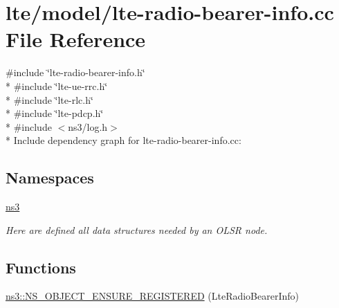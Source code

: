 \hypertarget{lte-radio-bearer-info_8cc}{}\section{lte/model/lte-\/radio-\/bearer-\/info.cc File Reference}
\label{lte-radio-bearer-info_8cc}
{\ttfamily \#include \char`\"{}lte-\/radio-\/bearer-\/info.\+h\char`\"{}}\\*
{\ttfamily \#include \char`\"{}lte-\/ue-\/rrc.\+h\char`\"{}}\\*
{\ttfamily \#include \char`\"{}lte-\/rlc.\+h\char`\"{}}\\*
{\ttfamily \#include \char`\"{}lte-\/pdcp.\+h\char`\"{}}\\*
{\ttfamily \#include $<$ns3/log.\+h$>$}\\*
Include dependency graph for lte-\/radio-\/bearer-\/info.cc\+:
\subsection*{Namespaces}
\begin{DoxyCompactItemize}
\item 
 \hyperlink{namespacens3}{ns3}
\begin{DoxyCompactList}\small\item\em Here are defined all data structures needed by an O\+L\+SR node. \end{DoxyCompactList}\end{DoxyCompactItemize}
\subsection*{Functions}
\begin{DoxyCompactItemize}
\item 
\hyperlink{namespacens3_acffc3f3cc7b787d7a6dd8b147e3aba0c}{ns3\+::\+N\+S\+\_\+\+O\+B\+J\+E\+C\+T\+\_\+\+E\+N\+S\+U\+R\+E\+\_\+\+R\+E\+G\+I\+S\+T\+E\+R\+ED} (Lte\+Radio\+Bearer\+Info)
\end{DoxyCompactItemize}
